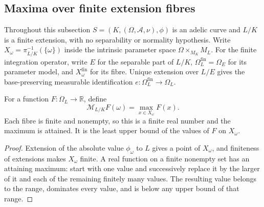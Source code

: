 \subsection{Maxima over finite extension fibres}

Throughout this subsection $S=(K,(\Omega,\mathcal A,\nu),\phi)$ is an
adelic curve and $L/K$ is a finite extension, with no separability or
normality hypothesis. Write $X_\omega=\pi_{L/K}^{-1}(\{\omega\})$
inside the intrinsic parameter space $\Omega\times_{M_K}M_L$.
For the finite integration operator, write $E$ for the separable part of
$L/K$, $\Omega_L^{\mathrm{fin}}=\Omega_E$ for its parameter model, and
$X_\omega^{\mathrm{fin}}$ for its fibre. Unique extension over $L/E$
gives the base-preserving measurable identification
$e:\Omega_L^{\mathrm{fin}}\to\Omega_L$.

\begin{definition}
\label{def:fibre-maximum}
\leanok
{}
For a function $F:\Omega_L\to\mathbb R$, define
\[
 \mathcal M_{L/K}F(\omega)=\max_{x\in X_\omega}F(x).
\]
Each fibre is finite and nonempty, so this is a finite real number and
the maximum is attained. It is the least upper bound of the values of
$F$ on $X_\omega$.
\end{definition}
\begin{proof}
Extension of the absolute value $\phi_\omega$ to $L$ gives a point of
$X_\omega$, and finiteness of extensions makes $X_\omega$ finite.
A real function on a finite nonempty set has an attaining maximum:
start with one value and successively replace it by the larger of it
and each of the remaining finitely many values. The resulting value
belongs to the range, dominates every value, and is below any upper
bound of that range.
\end{proof}

